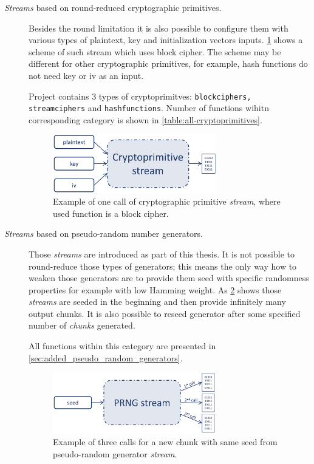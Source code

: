 \documentclass[
    digital,    %
    oneside,    %
    color,
    11pt,
    nocover,
    notable,
    nolof,
    nolot,
    final
]{fithesis3}
\renewcommand\_{\textunderscore\allowbreak}
\begin{document}
\begin{description}
	\item[\textit{Streams} based on round-reduced cryptographic primitives.] Besides the round limitation it is also possible to configure them with various types of plaintext, key and initialization vectors inputs. \cref{fig:crypto-stream} shows a scheme of such stream which uses block cipher. The scheme may be different for other cryptographic primitives, for example, hash functions do not need key or iv as an input.
	
	Project contains 3 types of cryptoprimitves: \texttt{block\_ciphers, stream\_ciphers} and \texttt{hash\_functions}. Number of functions wihitn corresponding category is shown in \cref{table:all-cryptoprimitives}.
	
	\begin{figure}[h]
		\centering
		\includegraphics[width=0.7\textwidth]{./images/pictures/cryptoprimitive-stream.png}
		\caption{Example of one call of cryptographic primitive \textit{stream}, where used function is a block cipher.}
		\label{fig:crypto-stream}
	\end{figure}
	
	\item[\textit{Streams} based on pseudo-random number generators.] Those \textit{streams} are introduced as part of this thesis. It is not possible to round-reduce those types of generators; this means the only way how to weaken those generators are to provide them seed with specific randomness properties for example with low Hamming weight. As \cref{fig:prng-streams} shows those \textit{streams} are seeded in the beginning and then provide infinitely many output chunks. It is also possible to reseed generator after some specified number of \textit{chunks} generated. 
	
	All functions within this category are presented in \cref{sec:added_pseudo_random_generators}.
	
	\begin{figure}[h]
		\centering
		\includegraphics[width=0.7\textwidth]{./images/pictures/prng-stream.png}
		\caption{Example of three calls for a new chunk with same seed from pseudo-random generator \textit{stream}.}
		\label{fig:prng-streams}
	\end{figure}
	
\end{description}
\end{document}
